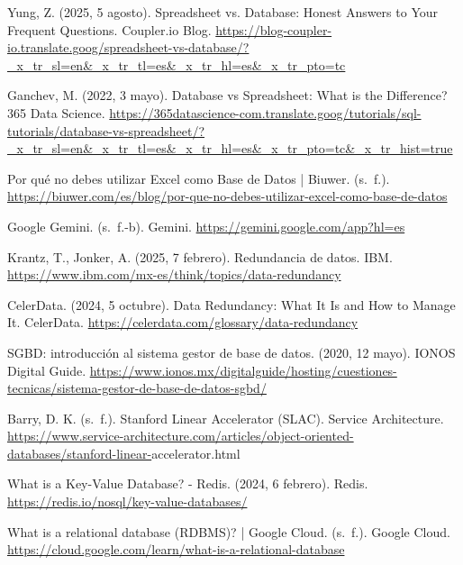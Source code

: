 \documentclass[12pt]{report}
\begin{document}
\begin{thebibliography}{99}
    Yung, Z. (2025, 5 agosto). Spreadsheet vs. Database: Honest Answers to Your Frequent Questions. Coupler.io Blog. \url{https://blog-coupler-io.translate.goog/spreadsheet-vs-database/?_x_tr_sl=en&_x_tr_tl=es&_x_tr_hl=es&_x_tr_pto=tc}

    Ganchev, M. (2022, 3 mayo). Database vs Spreadsheet: What is the Difference? 365 Data Science. \url{https://365datascience-com.translate.goog/tutorials/sql-tutorials/database-vs-spreadsheet/?_x_tr_sl=en&_x_tr_tl=es&_x_tr_hl=es&_x_tr_pto=tc&_x_tr_hist=true}

    Por qué no debes utilizar Excel como Base de Datos | Biuwer. (s. f.). \url{https://biuwer.com/es/blog/por-que-no-debes-utilizar-excel-como-base-de-datos}

    Google Gemini. (s. f.-b). Gemini. \url{https://gemini.google.com/app?hl=es}

    Krantz, T., Jonker, A. (2025, 7 febrero). Redundancia de datos. IBM. \url{https://www.ibm.com/mx-es/think/topics/data-redundancy}

    CelerData. (2024, 5 octubre). Data Redundancy: What It Is and How to Manage It. CelerData. \url{https://celerdata.com/glossary/data-redundancy}

    SGBD: introducción al sistema gestor de base de datos. (2020, 12 mayo). IONOS Digital Guide. \url{https://www.ionos.mx/digitalguide/hosting/cuestiones-tecnicas/sistema-gestor-de-base-de-datos-sgbd/}

    Barry, D. K. (s. f.). Stanford Linear Accelerator (SLAC). Service Architecture. \url{https://www.service-architecture.com/articles/object-oriented-databases/stanford-linear-}accelerator.html

    What is a Key-Value Database? - Redis. (2024, 6 febrero). Redis. \url{https://redis.io/nosql/key-value-databases/}

    What is a relational database (RDBMS)? | Google Cloud. (s. f.). Google Cloud. \url{https://cloud.google.com/learn/what-is-a-relational-database}
\end{thebibliography}
\end{document}
